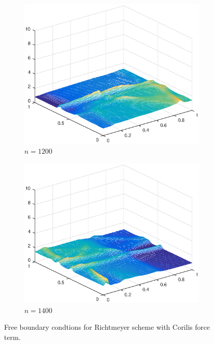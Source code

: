 \begin{figure}[h!]
\begin{subfigure}[t]{0.48\textwidth}
        \includegraphics[width=\textwidth]{images/sol_ri_1200cf.eps}
        \caption{$n=1200$}
        \label{fig:999}
    \end{subfigure}
     \begin{subfigure}[t]{0.48\textwidth}
        \centering
        \includegraphics[width=\textwidth]{images/sol_ri_1400cf.eps}
        \caption{$n=1400$}
        \label{fig:999}
    \end{subfigure}
    \caption{Free boundary condtions for Richtmeyer scheme with Corilis force term.}
    \label{fig:2DSolutions_ri_cf}
\end{figure}





